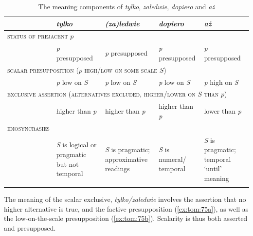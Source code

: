 \documentclass[output=paper,colorlinks,citecolor=brown]{langscibook}
\begin{document}
\begin{table}
\begin{tabularx}{\textwidth}{p{0.2cm}XXXX}
\lsptoprule
 & \textit{tylko} & \textit{(za)ledwie} & \textit{dopiero} & \textit{aż}\\\midrule
\multicolumn{4}{l}{\textsc{status of prejacent} $p$}&{}\\
&\cellcolor{black!10}\textit{p} presupposed&\cellcolor{black!10}\textit{p} presupposed&\cellcolor{black!10}\textit{p} presupposed&\cellcolor{black!10}\textit{p} presupposed\\[1ex]
\multicolumn{5}{l}{\textsc{scalar presupposition ($p$ high/low on some scale} $S$)}\\
&\cellcolor{black!10}\textit{p} low on \textit{S} &\cellcolor{black!10}\textit{p} low on \textit{S}&\cellcolor{black!10}\textit{p} low on \textit{S}&\cellcolor{black!20}\textit{p} high on \textit{S}\\[1ex]
\multicolumn{5}{l}{\textsc{exclusive assertion (alternatives excluded, higher/lower on $S$ than $p$)}}\\
&\cellcolor{black!10}higher than \textit{p}&\cellcolor{black!10}higher than \textit{p}&\cellcolor{black!10}higher than \textit{p}&\cellcolor{black!20}lower than \textit{p}\\[1ex]
\textsc{idiosyncrasies} &\\
&\cellcolor{black!10}\textit{S} is logical or pragmatic but not temporal&\cellcolor{black!20}\textit{S} is pragmatic; approximative readings &\cellcolor{black!10}\textit{S} is numeral/ temporal&\cellcolor{black!20}\textit{S} is pragmatic; temporal `until' meaning\\
\lspbottomrule
\end{tabularx}
\caption{The meaning components of \textit{tylko}, \textit{zaledwie}, \textit{dopiero} and \textit{aż}}
\label{tab:tom:1}
\end{table}

The meaning of the scalar exclusive, \textit{tylko/zaledwie} involves the assertion that no higher alternative is true, and the factive presupposition (\ref{ex:tom:75a}), as well as the low-on-the-scale presupposition (\ref{ex:tom:75b}). Scalarity is thus both asserted and presupposed.

\end{document}
